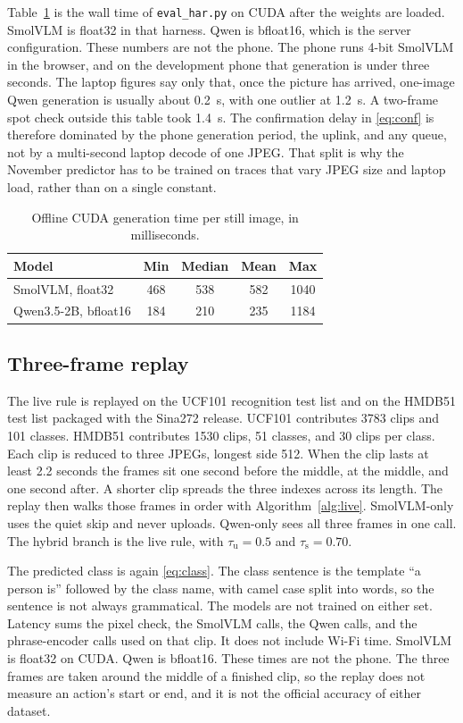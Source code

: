 Table~\ref{tab:time} is the wall time of \texttt{eval\_har.py} on CUDA
after the weights are loaded. SmolVLM is float32 in that harness. Qwen is
bfloat16, which is the server configuration. These numbers are not the
phone. The phone runs 4-bit SmolVLM in the browser, and on the development
phone that generation is under three seconds. The laptop figures say only
that, once the picture has arrived, one-image Qwen generation is usually
about 0.2~s, with one outlier at 1.2~s. A two-frame spot check outside this
table took 1.4~s. The confirmation delay in \eqref{eq:conf} is therefore
dominated by the phone generation period, the uplink, and any queue, not by
a multi-second laptop decode of one JPEG. That split is why the November
predictor has to be trained on traces that vary JPEG size and laptop load,
rather than on a single constant.

\begin{table}[t]
\caption{Offline CUDA generation time per still image, in milliseconds.}
\label{tab:time}
\centering
\begin{tabular}{lcccc}
\toprule
Model & Min & Median & Mean & Max \\
\midrule
SmolVLM, float32 & 468 & 538 & 582 & 1040 \\
Qwen3.5-2B, bfloat16 & 184 & 210 & 235 & 1184 \\
\bottomrule
\end{tabular}
\end{table}

\subsection{Three-frame replay}

The live rule is replayed on the UCF101 recognition test list and on the
HMDB51 test list packaged with the Sina272 release. UCF101 contributes
3783 clips and 101 classes. HMDB51 contributes 1530 clips, 51 classes, and
30 clips per class. Each clip is reduced to three JPEGs, longest side 512.
When the clip lasts at least 2.2 seconds the frames sit one second before
the middle, at the middle, and one second after. A shorter clip spreads
the three indexes across its length. The replay then walks those frames in
order with Algorithm~\ref{alg:live}. SmolVLM-only uses the quiet skip and
never uploads. Qwen-only sees all three frames in one call. The hybrid
branch is the live rule, with \(\tau_{\mathrm{u}}=0.5\) and
\(\tau_{\mathrm{s}}=0.70\).

The predicted class is again \eqref{eq:class}. The class sentence is the
template ``a person is'' followed by the class name, with camel case split
into words, so the sentence is not always grammatical. The models are not
trained on either set. Latency sums the pixel check, the SmolVLM calls, the
Qwen calls, and the phrase-encoder calls used on that clip. It does not
include Wi-Fi time. SmolVLM is float32 on CUDA. Qwen is bfloat16. These
times are not the phone. The three frames are taken around the middle of a
finished clip, so the replay does not measure an action's start or end,
and it is not the official accuracy of either dataset.

